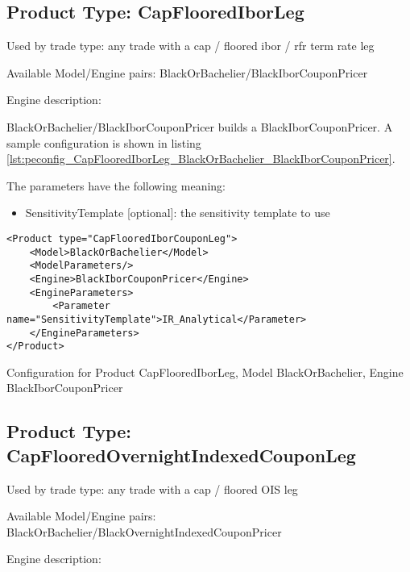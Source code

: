 \subsection{Product Type: CapFlooredIborLeg}

Used by trade type: any trade with a cap / floored ibor / rfr term rate leg

Available Model/Engine pairs: BlackOrBachelier/BlackIborCouponPricer

Engine description:

BlackOrBachelier/BlackIborCouponPricer builds a BlackIborCouponPricer. A sample configuration is
shown in listing \ref{lst:peconfig_CapFlooredIborLeg_BlackOrBachelier_BlackIborCouponPricer}.

The parameters have the following meaning:

\begin{itemize}
\item SensitivityTemplate [optional]: the sensitivity template to use 
\end{itemize}

\begin{longlisting}
\begin{verbatim}
<Product type="CapFlooredIborCouponLeg">
    <Model>BlackOrBachelier</Model>
    <ModelParameters/>
    <Engine>BlackIborCouponPricer</Engine>
    <EngineParameters>
        <Parameter name="SensitivityTemplate">IR_Analytical</Parameter>
    </EngineParameters>
</Product>
\end{verbatim}
\caption{Configuration for Product CapFlooredIborLeg, Model BlackOrBachelier, Engine BlackIborCouponPricer}
\label{lst:peconfig_CapFlooredIborLeg_BlackOrBachelier_BlackIborCouponPricer}
\end{longlisting}

\subsection{Product Type: CapFlooredOvernightIndexedCouponLeg}

Used by trade type: any trade with a cap / floored OIS leg

Available Model/Engine pairs: BlackOrBachelier/BlackOvernightIndexedCouponPricer

Engine description:

